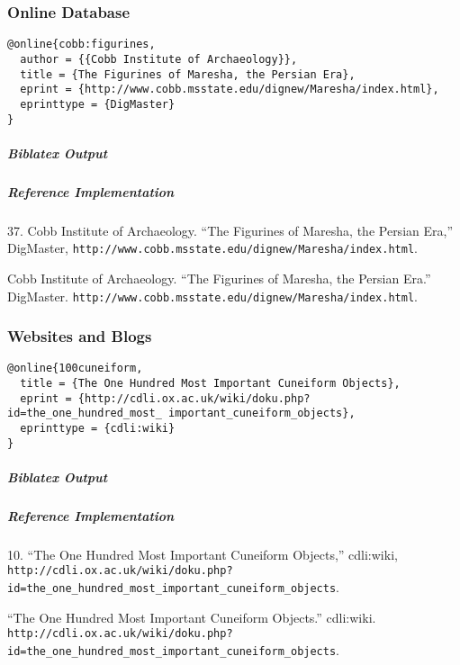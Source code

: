 \documentclass[a4paper]{article}
\newenvironment{biboutput}{%
  \subparagraph{Biblatex Output}
}{\color{black}}
\newenvironment{refimp}{%
  \subparagraph{Reference Implementation}
  \color{reference-colour}
  \rm
}{\par\color{black}}
\begin{document}
\subsubsection{Online Database}

\begin{lstlisting}
@online{cobb:figurines,
  author = {{Cobb Institute of Archaeology}},
  title = {The Figurines of Maresha, the Persian Era},
  eprint = {http://www.cobb.msstate.edu/dignew/Maresha/index.html},
  eprinttype = {DigMaster}
}
\end{lstlisting}

\begin{biboutput}
\end{biboutput}

\begin{refimp}
  \hspace*{\bibindent}37. Cobb Institute of Archaeology. “The Figurines of
  Maresha, the Persian Era,” DigMaster,
  \nolinkurl{http://www.cobb.msstate.edu/dignew/Maresha/index.html}.

  \hangindent\bibindent Cobb Institute of Archaeology. “The Figurines of
  Maresha, the Persian Era.” DigMaster.
  \nolinkurl{http://www.cobb.msstate.edu/dignew/Maresha/index.html}.
\end{refimp}

\subsubsection{Websites and Blogs}

\begin{lstlisting}
@online{100cuneiform,
  title = {The One Hundred Most Important Cuneiform Objects},
  eprint = {http://cdli.ox.ac.uk/wiki/doku.php?id=the_one_hundred_most_ important_cuneiform_objects},
  eprinttype = {cdli:wiki}
}
\end{lstlisting}

\begin{biboutput}
\end{biboutput}

\begin{refimp}
  \hspace*{\bibindent}10. “The One Hundred Most Important Cuneiform Objects,”
  cdli:wiki,
  \nolinkurl{http://cdli.ox.ac.uk/wiki/doku.php?id=the_one_hundred_most_important_cuneiform_objects}.

  \hangindent\bibindent “The One Hundred Most Important Cuneiform Objects.”
  cdli:wiki.
  \nolinkurl{http://cdli.ox.ac.uk/wiki/doku.php?id=the_one_hundred_most_important_cuneiform_objects}.
\end{refimp}
\end{document}
